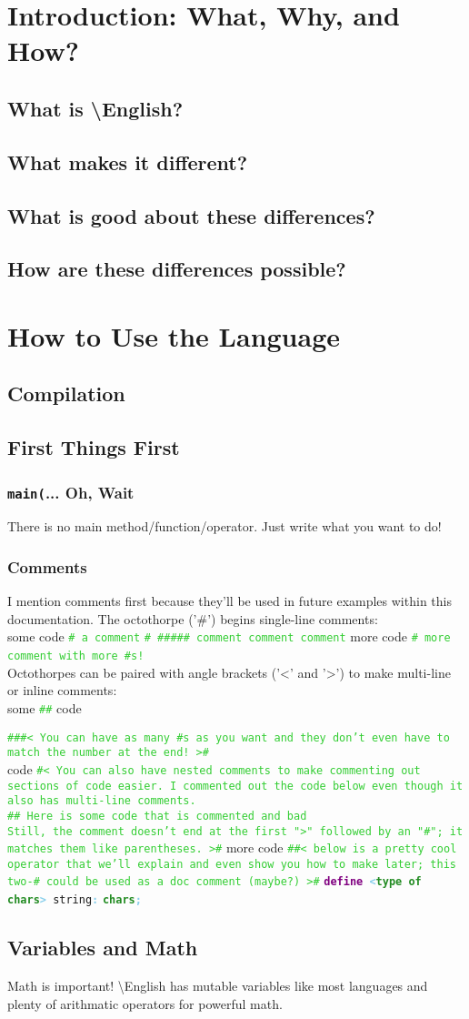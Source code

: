 \documentclass{article}
\newcommand{\name}{\textbackslash{}English}				%
\newcommand{\secl}[1]{\section{#1}\label{sec:#1}}
\newcommand{\ssecl}[1]{\subsection{#1}\label{ssec:#1}}
\newcommand{\sssecl}[1]{\subsubsection{#1}\label{sssec:#1}}
\newcommand{\codecomment}[1]{\texttt{\textcolor{LimeGreen}{#1}}}
\newcommand{\commentline}[1]{\codecomment{\# #1}}
\newcommand{\type}[1]{\texttt{\textcolor{ForestGreen}{\textbf{#1}}}}
\newcommand{\keyop}[1]{\texttt{\textcolor{Purple}{\textbf{#1}}}}
\newcommand{\defpunct}[1]{\texttt{\textcolor{SkyBlue}{\textbf{#1}}}}
\newcommand{\define}[2]{\texttt{\keyop{define} \defpunct{<}#1\defpunct{>} #2\defpunct{:}}}
\newenvironment{code}[0]
{\ttfamily{}				%
\setlength\parindent{0cm}	%
~\\}
{\setlength\parindent{1cm}
~\\}
\begin{document}
\setlength\parindent{1cm}								%

\tableofcontents
\newpage

\obeylines												%

\secl{Introduction: What, Why, and How?}
\ssecl{What is \name{}?}

\ssecl{What makes it different?}

\ssecl{What is good about these differences?}

\ssecl{How are these differences possible?}

\secl{How to Use the Language}
\ssecl{Compilation}

\ssecl{First Things First}
\sssecl{\texttt{main(}... Oh, Wait}
\indent There is no main method/function/operator. Just write what you want to do!
\sssecl{Comments}
\indent I mention comments first because they'll be used in future examples within this documentation.
\indent The octothorpe ('\#') begins single-line comments:
\begin{code}
some code		\commentline{a comment}
\commentline{\#\#\#\#\# comment comment comment}
more code		\commentline{more comment with more \#s!}
\end{code}
\indent Octothorpes can be paired with angle brackets ('<' and '>') to make multi-line or inline comments:
\begin{code}
some \codecomment{\#< awesome >\#} code

\codecomment{\#\#\#< You can have as many \#s as you want and they don't
even have to match the number at the end! >\#\\}
code
\codecomment{\#< You can also have nested comments to make commenting out sections of code easier. 
I commented out the code below even though it also has multi-line comments.\\

\#< This is a comment >\# Here is some code that is commented and bad\\

Still, the comment doesn't end at the first ">" followed by an "\#"; it matches them like parentheses. 
>\#}
more code
\codecomment{\#\#< below is a pretty cool operator that we'll explain and even show you how to make later; this two-\# could be used as a doc comment (maybe?) >\#}
\define{\type{type of chars}}{string}
\qquad\type{chars}\defpunct{;}
\end{code}

\ssecl{Variables and Math}
\indent Math is important! \name{} has mutable variables like most languages and plenty of arithmatic operators for powerful math.
\end{document}
